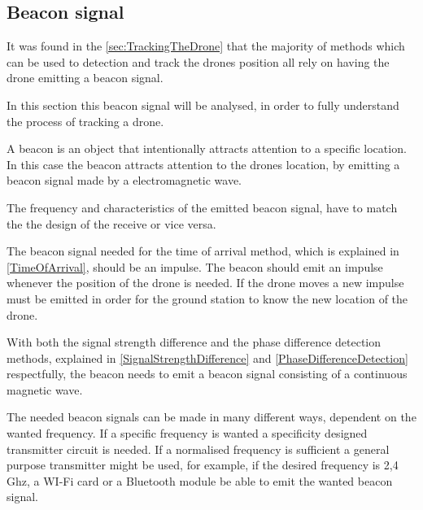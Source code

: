 \subsection{Beacon signal}

It was found in the \autoref{sec:TrackingTheDrone} that the majority of methods which can be used to detection and track the drones position all rely on having the drone emitting a beacon signal. 

In this section this beacon signal will be analysed, in order to fully understand the process of tracking a drone. 

A beacon is an object that intentionally attracts attention to a specific location. In this case the beacon attracts attention to the drones location, by emitting a beacon signal made by a electromagnetic wave. 

The frequency and characteristics of the emitted beacon signal, have  to match the the design of the receive or vice versa. 

The beacon signal needed for the time of arrival method, which is explained in \autoref{TimeOfArrival}, should be an impulse. The beacon should emit an impulse whenever the position of the drone is needed. If the drone moves a new impulse must be emitted in order for the ground station to know the new location of the drone. 

With both the signal strength difference and the phase difference detection methods, explained in \autoref{SignalStrengthDifference} and \autoref{PhaseDifferenceDetection} respectfully, the beacon needs to emit a beacon signal consisting of a continuous magnetic wave. 

The needed beacon signals can be made in many different ways,  
dependent on the wanted frequency. If a specific frequency is wanted a specificity designed transmitter circuit is needed. 
If a normalised frequency is sufficient a general purpose transmitter might be used, for example, if the desired frequency is 2,4 Ghz, a WI-Fi card or a Bluetooth module be able to emit the wanted beacon signal. 